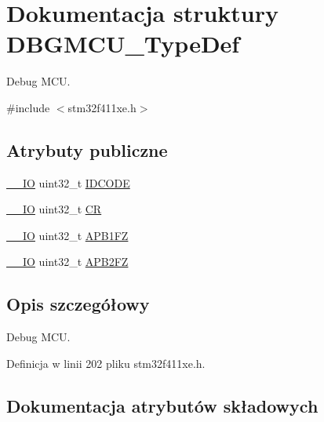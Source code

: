 \hypertarget{struct_d_b_g_m_c_u___type_def}{}\section{Dokumentacja struktury D\+B\+G\+M\+C\+U\+\_\+\+Type\+Def}
\label{struct_d_b_g_m_c_u___type_def}


Debug M\+CU.  




{\ttfamily \#include $<$stm32f411xe.\+h$>$}

\subsection*{Atrybuty publiczne}
\begin{DoxyCompactItemize}
\item 
\hyperlink{core__sc300_8h_aec43007d9998a0a0e01faede4133d6be}{\+\_\+\+\_\+\+IO} uint32\+\_\+t \hyperlink{struct_d_b_g_m_c_u___type_def_a0cc3561c124d06bb57dfa855e43ed99f}{I\+D\+C\+O\+DE}
\item 
\hyperlink{core__sc300_8h_aec43007d9998a0a0e01faede4133d6be}{\+\_\+\+\_\+\+IO} uint32\+\_\+t \hyperlink{struct_d_b_g_m_c_u___type_def_a15981828f2b915d38570cf6684e99a53}{CR}
\item 
\hyperlink{core__sc300_8h_aec43007d9998a0a0e01faede4133d6be}{\+\_\+\+\_\+\+IO} uint32\+\_\+t \hyperlink{struct_d_b_g_m_c_u___type_def_aac341c7e09cd5224327eeb7d9f122bed}{A\+P\+B1\+FZ}
\item 
\hyperlink{core__sc300_8h_aec43007d9998a0a0e01faede4133d6be}{\+\_\+\+\_\+\+IO} uint32\+\_\+t \hyperlink{struct_d_b_g_m_c_u___type_def_a011f892d86367dbe786964b14bc515a6}{A\+P\+B2\+FZ}
\end{DoxyCompactItemize}


\subsection{Opis szczegółowy}
Debug M\+CU. 

Definicja w linii 202 pliku stm32f411xe.\+h.



\subsection{Dokumentacja atrybutów składowych}
\mbox{\label{struct_d_b_g_m_c_u___type_def_aac341c7e09cd5224327eeb7d9f122bed}} 
